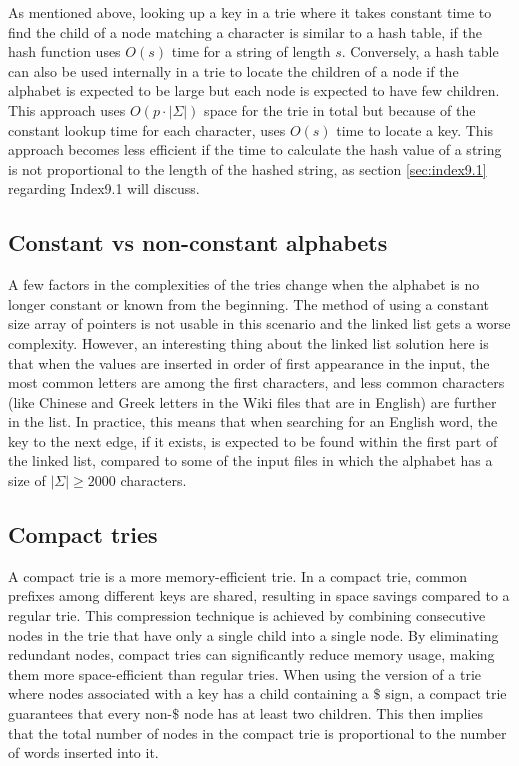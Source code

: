 As mentioned above, looking up a key in a trie where it takes constant time to find the child of a node matching a character is similar to a hash table, if the hash function uses $O(s)$ time for a string of length $s$. Conversely, a hash table can also be used internally in a trie to locate the children of a node if the alphabet is expected to be large but each node is expected to have few children. This approach uses $O(p\cdot|\Sigma|)$ space for the trie in total but because of the constant lookup time for each character, uses $O(s)$ time to locate a key. This approach becomes less efficient if the time to calculate the hash value of a string is not proportional to the length of the hashed string, as section \ref{sec:index9.1} regarding Index9.1 will discuss. 


\subsection{Constant vs non-constant alphabets}

A few factors in the complexities of the tries change when the alphabet is no longer constant or known from the beginning. The method of using a constant size array of pointers is not usable in this scenario and the linked list gets a worse complexity. However, an interesting thing about the linked list solution here is that when the values are inserted in order of first appearance in the input, the most common letters are among the first characters, and less common characters (like Chinese and Greek letters in the Wiki files that are in English) are further in the list. In practice, this means that when searching for an English word, the key to the next edge, if it exists, is expected to be found within the first part of the linked list, compared to some of the input files in which the alphabet has a size of $|\Sigma|\geq2000$ characters. 



\subsection{Compact tries}\label{sec:compact_tries}
A compact trie is a more memory-efficient trie. In a compact trie, common prefixes among different keys are shared, resulting in space savings compared to a regular trie. This compression technique is achieved by combining consecutive nodes in the trie that have only a single child into a single node. By eliminating redundant nodes, compact tries can significantly reduce memory usage, making them more space-efficient than regular tries. When using the version of a trie where nodes associated with a key has a child containing a $\$$ sign, a compact trie guarantees that every non-$\$$ node has at least two children. This then implies that the total number of nodes in the compact trie is proportional to the number of words inserted into it. 

